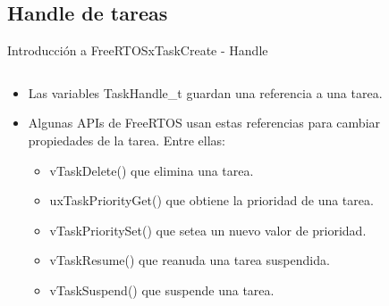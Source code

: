 \documentclass[aspectratio=169, xcolor=dvipsnames]{beamer}
\begin{document}
\subsection{Handle de tareas}
\begin{frame}{Introducción a FreeRTOS}{xTaskCreate - Handle}
\begin{columns}
\begin{column}{0.6\textwidth}
\begin{itemize}
    \item Las variables \textcolor{myblue}{TaskHandle\_t} guardan una referencia a una tarea.
    \item Algunas APIs de FreeRTOS usan estas referencias para cambiar propiedades de la tarea. Entre ellas:\newline
    \begin{itemize}
        \item \textcolor{myblue}{vTaskDelete()} que elimina una tarea.
        \item \textcolor{myblue}{uxTaskPriorityGet()} que obtiene la prioridad de una tarea.
        \item \textcolor{myblue}{vTaskPrioritySet()} que setea un nuevo valor de prioridad.
        \item \textcolor{myblue}{vTaskResume()} que reanuda una tarea suspendida.
        \item \textcolor{myblue}{vTaskSuspend()} que suspende una tarea.
    \end{itemize}
\end{itemize}
\end{column}
\begin{column}{0.4\textwidth}

\end{column}
\end{columns}
\end{frame}
\end{document}
